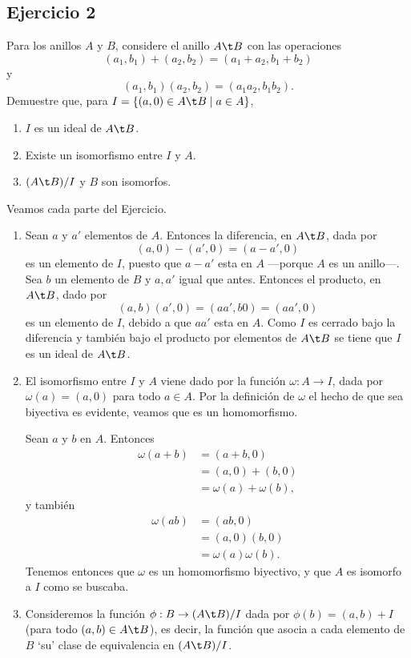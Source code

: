 \subsection*{Ejercicio 2}
	Para los anillos $A$ y $B$, considere el anillo $A\t B$ con las operaciones
\[ (a_1,b_1) + (a_2,b_2) = (a_1+a_2,b_1+b_2) \]
y
\[ (a_1,b_1)(a_2,b_2) = (a_1a_2,b_1b_2). \]
Demuestre que, para $I = \{ (a,0)\in A\t B \mid a\in A \}$,
\begin{enumerate}
	\item $I$ es un ideal de $A\t B$.
	\item Existe un isomorfismo entre $I$ y $A$.
	\item $(A\t B)/I$ y $B$ son isomorfos.
\end{enumerate}
\begin{sol}
	Veamos cada parte del Ejercicio.
	\begin{enumerate}
		\item Sean $a$ y $a'$ elementos de $A$. Entonces la diferencia, en $A\t B$, dada por
		\[ (a,0) - (a',0) = (a-a',0) \]
		es un elemento de $I$, puesto que $a-a'$ esta en $A$ ---porque $A$ es un anillo---.
		Sea $b$ un elemento de $B$ y $a,a'$ igual que antes. Entonces el producto, en $A\t B$, dado por
		\[ (a,b)(a',0) = (aa',b0) = (aa',0) \]
		es un elemento de $I$, debido a que $aa'$ esta en $A$. Como $I$ es cerrado bajo la diferencia y también bajo el producto por elementos de $A\t B$ se tiene que $I$ es un ideal de $A\t B$.
		\item El isomorfismo entre $I$ y $A$ viene dado por la función $\omega: A\to I$, dada por $\omega(a) = (a,0)$ para todo $a\in A$. Por la definición de $\omega$ el hecho de que sea biyectiva es evidente, veamos que es un homomorfismo. 
		
		Sean $a$ y $b$ en $A$. Entonces
		\begin{align*}
			\omega(a+b) &= (a+b,0) \\
						&= (a,0) + (b,0) \\
						&= \omega(a) + \omega(b), 
		\end{align*}
		y también
		\begin{align*}
			\omega(ab) &= (ab,0) \\
					   &= (a,0)(b,0) \\
					   &= \omega(a)\omega(b).	
		\end{align*}
		Tenemos entonces que $\omega$ es un homomorfismo biyectivo, y que $A$ es isomorfo a $I$ como se buscaba.
		\item Consideremos la función $\phi: B\to (A\t B)/I$ dada por $\phi(b) = (a,b) + I$ (para todo $(a,b)\in A\t B$), es decir, la función que asocia a cada elemento de $B$ `su' clase de equivalencia en $(A\t B)/I$. 
		

\end{enumerate}
\end{sol}
